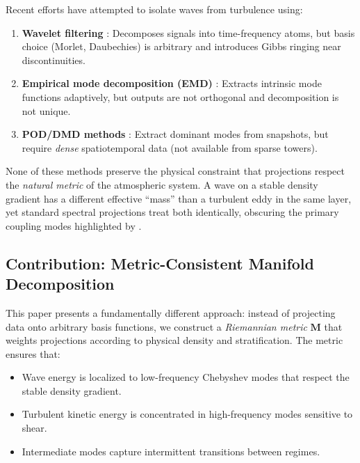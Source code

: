 \documentclass[11pt,a4paper]{article}
\begin{document}
Recent efforts have attempted to isolate waves from turbulence using:
\begin{enumerate}
  \item \textbf{Wavelet filtering} \citep{Vosper2006, Sun2015}: Decomposes signals into time-frequency atoms, but basis choice (Morlet, Daubechies) is arbitrary and introduces Gibbs ringing near discontinuities.
  \item \textbf{Empirical mode decomposition (EMD)} \citep{Huang2009}: Extracts intrinsic mode functions adaptively, but outputs are not orthogonal and decomposition is not unique.
  \item \textbf{POD/DMD methods} \citep{Schmid2010}: Extract dominant modes from snapshots, but require \emph{dense} spatiotemporal data (not available from sparse towers).
\end{enumerate}

None of these methods preserve the physical constraint that projections respect the \emph{natural metric} of the atmospheric system. A wave on a stable density gradient has a different effective ``mass'' than a turbulent eddy in the same layer, yet standard spectral projections treat both identically, obscuring the primary coupling modes highlighted by \citet{Sun2015}.

\subsection{Contribution: Metric-Consistent Manifold Decomposition}

This paper presents a fundamentally different approach: instead of projecting data onto arbitrary basis functions, we construct a \emph{Riemannian metric} $\mathbf{M}$ that weights projections according to physical density and stratification. The metric ensures that:
\begin{itemize}
  \item Wave energy is localized to low-frequency Chebyshev modes that respect the stable density gradient.
  \item Turbulent kinetic energy is concentrated in high-frequency modes sensitive to shear.
  \item Intermediate modes capture intermittent transitions between regimes.
\end{itemize}
\end{document}
